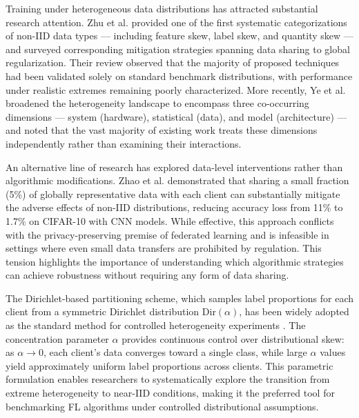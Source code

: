 \documentclass[conference]{IEEEtran}
\begin{document}
Training under heterogeneous data distributions has attracted substantial research attention. Zhu et al. \cite{zhu2021noniid} provided one of the first systematic categorizations of non-IID data types --- including feature skew, label skew, and quantity skew --- and surveyed corresponding mitigation strategies spanning data sharing to global regularization. Their review observed that the majority of proposed techniques had been validated solely on standard benchmark distributions, with performance under realistic extremes remaining poorly characterized. More recently, Ye et al. \cite{ye2023heterogeneous} broadened the heterogeneity landscape to encompass three co-occurring dimensions --- system (hardware), statistical (data), and model (architecture) --- and noted that the vast majority of existing work treats these dimensions independently rather than examining their interactions.

An alternative line of research has explored data-level interventions rather than algorithmic modifications. Zhao et al. \cite{zhao2018noniid} demonstrated that sharing a small fraction (5\%) of globally representative data with each client can substantially mitigate the adverse effects of non-IID distributions, reducing accuracy loss from 11\% to 1.7\% on CIFAR-10 with CNN models. While effective, this approach conflicts with the privacy-preserving premise of federated learning and is infeasible in settings where even small data transfers are prohibited by regulation. This tension highlights the importance of understanding which algorithmic strategies can achieve robustness without requiring any form of data sharing.

The Dirichlet-based partitioning scheme, which samples label proportions for each client from a symmetric Dirichlet distribution $\text{Dir}(\alpha)$, has been widely adopted as the standard method for controlled heterogeneity experiments \cite{hsu2019dirichlet}. The concentration parameter $\alpha$ provides continuous control over distributional skew: as $\alpha \to 0$, each client's data converges toward a single class, while large $\alpha$ values yield approximately uniform label proportions across clients. This parametric formulation enables researchers to systematically explore the transition from extreme heterogeneity to near-IID conditions, making it the preferred tool for benchmarking FL algorithms under controlled distributional assumptions.
\end{document}
